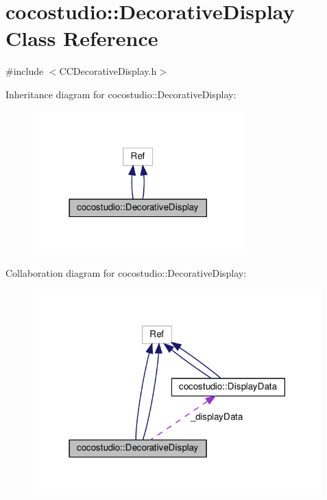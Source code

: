 \hypertarget{classcocostudio_1_1DecorativeDisplay}{}\section{cocostudio\+:\+:Decorative\+Display Class Reference}
\label{classcocostudio_1_1DecorativeDisplay}


{\ttfamily \#include $<$C\+C\+Decorative\+Display.\+h$>$}



Inheritance diagram for cocostudio\+:\+:Decorative\+Display\+:
\nopagebreak
\begin{figure}[H]
\begin{center}
\leavevmode
\includegraphics[width=230pt]{classcocostudio_1_1DecorativeDisplay__inherit__graph}
\end{center}
\end{figure}


Collaboration diagram for cocostudio\+:\+:Decorative\+Display\+:
\nopagebreak
\begin{figure}[H]
\begin{center}
\leavevmode
\includegraphics[width=316pt]{classcocostudio_1_1DecorativeDisplay__coll__graph}
\end{center}
\end{figure}
